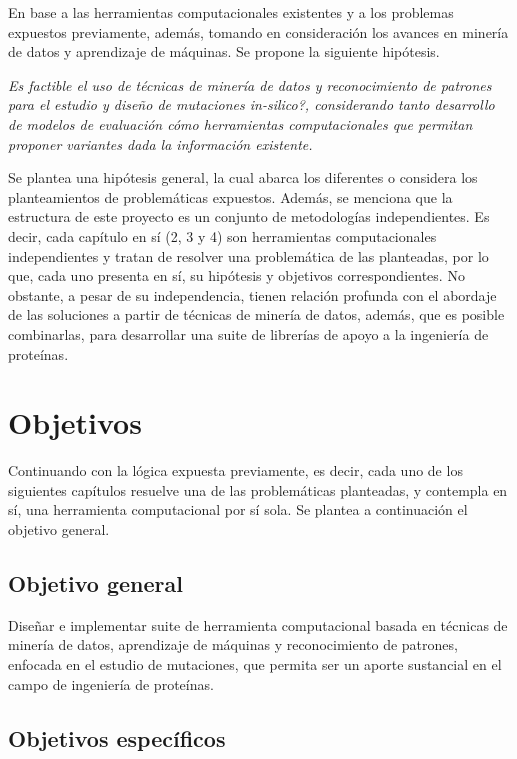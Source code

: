 En base a las herramientas computacionales existentes y a los problemas expuestos previamente, además, tomando en consideración los avances en minería de datos y aprendizaje de máquinas. Se propone la siguiente hipótesis.

\begin{center}
	\textit{Es factible el uso de técnicas de minería de datos y reconocimiento de patrones para el estudio y diseño de mutaciones in-silico?, considerando tanto desarrollo de modelos de evaluación cómo herramientas computacionales que permitan proponer variantes dada la información existente.}
\end{center}

Se plantea una hipótesis general, la cual abarca los diferentes o considera los planteamientos de problemáticas expuestos. Además, se menciona que la estructura de este proyecto es un conjunto de metodologías independientes. Es decir, cada capítulo en sí (2, 3 y 4) son herramientas computacionales independientes y tratan de resolver una problemática de las planteadas, por lo que, cada uno presenta en sí, su hipótesis y objetivos correspondientes. No obstante, a pesar de su independencia, tienen relación profunda con el abordaje de las soluciones a partir de técnicas de minería de datos, además, que es posible combinarlas, para desarrollar una suite de librerías de apoyo a la ingeniería de proteínas.

\section{Objetivos}

Continuando con la lógica expuesta previamente, es decir, cada uno de los siguientes capítulos resuelve una de las problemáticas planteadas, y contempla en sí, una herramienta computacional por sí sola. Se plantea a continuación el objetivo general.

\subsection{Objetivo general}

Diseñar e implementar suite de herramienta computacional basada en técnicas de minería de datos, aprendizaje de máquinas y reconocimiento de patrones, enfocada en el estudio de mutaciones, que permita ser un aporte sustancial en el campo de ingeniería de proteínas.

\subsection{Objetivos específicos}

